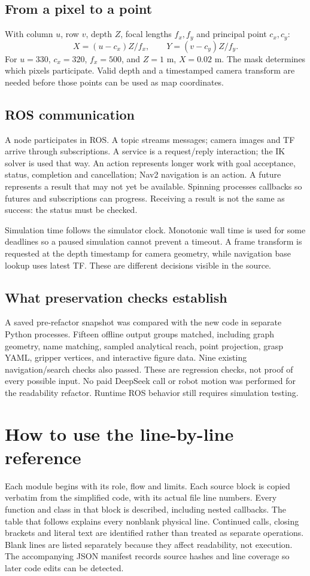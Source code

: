 \documentclass[11pt,a4paper]{book}
\begin{document}
\section{From a pixel to a point}
With column $u$, row $v$, depth $Z$, focal lengths $f_x,f_y$ and principal point
$c_x,c_y$:
\[
X=(u-c_x)Z/f_x,\qquad Y=(v-c_y)Z/f_y.
\]
For $u=330$, $c_x=320$, $f_x=500$, and $Z=1$ m, $X=0.02$ m. The mask determines
which pixels participate. Valid depth and a timestamped camera transform are
needed before those points can be used as map coordinates.

\section{ROS communication}
A node participates in ROS. A topic streams messages; camera images and TF arrive
through subscriptions. A service is a request/reply interaction; the IK solver is
used that way. An action represents longer work with goal acceptance, status,
completion and cancellation; Nav2 navigation is an action. A future represents a
result that may not yet be available. Spinning processes callbacks so futures and
subscriptions can progress. Receiving a result is not the same as success: the
status must be checked.

Simulation time follows the simulator clock. Monotonic wall time is used for
some deadlines so a paused simulation cannot prevent a timeout. A frame transform
is requested at the depth timestamp for camera geometry, while navigation base
lookup uses latest TF. These are different decisions visible in the source.

\section{What preservation checks establish}
A saved pre-refactor snapshot was compared with the new code in separate Python
processes. Fifteen offline output groups matched, including graph geometry,
name matching, sampled analytical reach, point projection, grasp YAML, gripper
vertices, and interactive figure data. Nine existing navigation/search checks
also passed. These are regression checks, not proof of every possible input.
No paid DeepSeek call or robot motion was performed for the readability refactor.
Runtime ROS behavior still requires simulation testing.

\chapter{How to use the line-by-line reference}
Each module begins with its role, flow and limits. Each source block is copied
verbatim from the simplified code, with its actual file line numbers. Every
function and class in that block is described, including nested callbacks.
The table that follows explains every nonblank physical line. Continued calls,
closing brackets and literal text are identified rather than treated as separate
operations. Blank lines are listed separately because they affect readability,
not execution. The accompanying JSON manifest records source hashes and line
coverage so later code edits can be detected.
\end{document}
